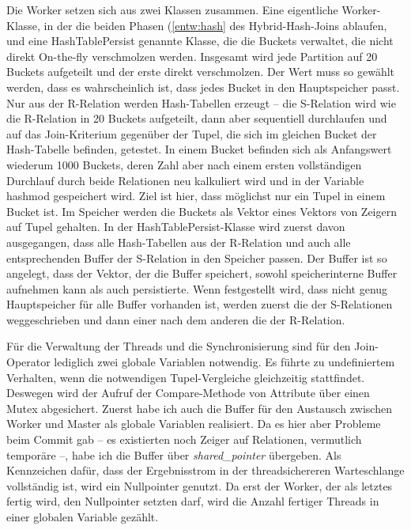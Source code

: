 \documentclass[a4paper,12pt,twoside]{article}
\newcommand{\Fb}[1]{\textit{#1}} %
\begin{document}
{Die Worker setzen sich aus zwei Klassen zusammen. Eine eigentliche Worker-Klasse, in der die beiden Phasen (\autoref{entw:hash} des Hybrid-Hash-Joins ablaufen, und eine HashTablePersist genannte Klasse, die die Buckets verwaltet, die nicht direkt On-the-fly verschmolzen werden. Insgesamt wird jede Partition auf 20 Buckets aufgeteilt und der erste direkt verschmolzen. Der Wert muss so gewählt werden, dass es wahrscheinlich ist, dass jedes Bucket in den Hauptspeicher passt. Nur aus der R-Relation werden Hash-Tabellen erzeugt -- die S-Relation wird wie die R-Relation in 20 Buckets aufgeteilt, dann aber sequentiell durchlaufen und auf das Join-Kriterium gegenüber der Tupel, die sich im gleichen Bucket der Hash-Tabelle befinden, getestet. In einem Bucket befinden sich als Anfangswert wiederum 1000 Buckets, deren Zahl aber nach einem ersten vollständigen Durchlauf durch beide Relationen neu kalkuliert wird und in der Variable hashmod gespeichert wird. Ziel ist hier, dass möglichst nur ein Tupel in einem Bucket ist. Im Speicher werden die Buckets als Vektor eines Vektors von Zeigern auf Tupel gehalten. In der HashTablePersist-Klasse wird zuerst davon ausgegangen, dass alle Hash-Tabellen aus der R-Relation und auch alle entsprechenden Buffer der S-Relation in den Speicher passen. Der Buffer ist so angelegt, dass der Vektor, der die Buffer speichert, sowohl speicherinterne Buffer aufnehmen kann als auch persistierte. Wenn festgestellt wird, dass nicht genug Hauptspeicher für alle Buffer vorhanden ist, werden zuerst die der S-Relationen weggeschrieben und dann einer nach dem anderen die der R-Relation.

Für die Verwaltung der Threads und die Synchronisierung sind für den Join-Operator lediglich zwei globale Variablen notwendig. Es führte zu undefiniertem Verhalten, wenn die notwendigen Tupel-Vergleiche gleichzeitig stattfindet. Deswegen wird der Aufruf der Compare-Methode von Attribute über einen Mutex abgesichert. Zuerst habe ich auch die Buffer für den Austausch zwischen Worker und Master als globale Variablen realisiert. Da es hier aber Probleme beim Commit gab -- es existierten noch Zeiger auf Relationen, vermutlich temporäre --, habe ich die Buffer über \Fb{shared\_pointer} übergeben. Als Kennzeichen dafür, dass der Ergebnisstrom in der threadsichereren Warteschlange vollständig ist, wird ein Nullpointer genutzt. Da erst der Worker, der als letztes fertig wird, den Nullpointer setzten darf, wird die Anzahl fertiger Threads in einer globalen Variable gezählt.
 
}
\end{document}
